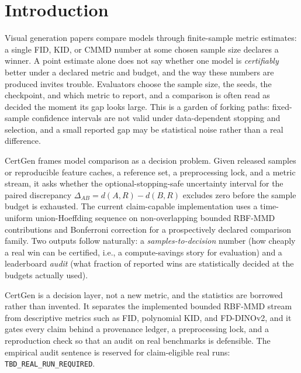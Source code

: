 \section{Introduction}

Visual generation papers compare models through finite-sample metric estimates:
a single FID, KID, or CMMD number at some chosen sample size declares a winner.
A point estimate alone does not say whether one model is \emph{certifiably}
better under a declared metric and budget, and the way these numbers are
produced invites trouble. Evaluators choose the sample size, the seeds, the
checkpoint, and which metric to report, and a comparison is often read as decided
the moment its gap looks large. This is a garden of forking paths: fixed-sample
confidence intervals are not valid under data-dependent stopping and selection,
and a small reported gap may be statistical noise rather than a real difference.

CertGen frames model comparison as a decision problem. Given released samples or
reproducible feature caches, a reference set, a preprocessing lock, and a metric
stream, it asks whether the optional-stopping-safe uncertainty interval for the
paired discrepancy $\Delta_{AB}=d(A,R)-d(B,R)$ excludes zero before the sample
budget is exhausted. The current claim-capable implementation uses a
time-uniform union-Hoeffding sequence on non-overlapping bounded RBF-MMD
contributions and Bonferroni correction for a prospectively declared comparison
family. Two outputs follow naturally: a
\emph{samples-to-decision} number (how cheaply a real win can be certified, i.e.,
a compute-savings story for evaluation) and a leaderboard \emph{audit} (what
fraction of reported wins are statistically decided at the budgets actually
used).

CertGen is a decision layer, not a new metric, and the statistics are borrowed
rather than invented. It separates the implemented bounded RBF-MMD stream from
descriptive metrics such as FID, polynomial KID, and FD-DINOv2, and it
gates every claim behind a provenance ledger, a preprocessing lock, and a
reproduction check so that an audit on real benchmarks is defensible. The
empirical audit sentence is reserved for claim-eligible real runs:
\texttt{TBD\_REAL\_RUN\_REQUIRED}.
